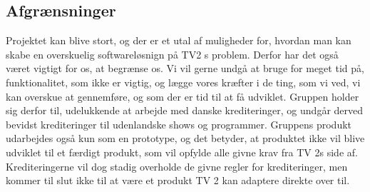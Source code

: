 \subsection{Afgrænsninger}
Projektet kan blive stort, og der er et utal af muligheder for, hvordan man kan skabe en overskuelig softwareløsnign på TV2 s problem. Derfor har det også været vigtigt for os, at begrænse os. Vi vil gerne undgå at bruge for meget tid på, funktionalitet, som ikke er vigtig, og lægge vores kræfter i de ting, som vi ved, vi kan overskue at gennemføre, og som der er tid til at få udviklet. Gruppen holder sig derfor til, udelukkende at arbejde med danske krediteringer, og undgår derved bevidst krediteringer til udenlandske shows og programmer. %
Gruppens produkt udarbejdes også kun som en prototype, og det betyder, at produktet ikke vil blive udviklet til et færdigt produkt, som vil opfylde alle givne krav fra TV 2s side af. Krediteringerne vil dog stadig overholde de givne regler for krediteringer, men kommer til slut ikke til at være et produkt TV 2 kan adaptere direkte over til. 

